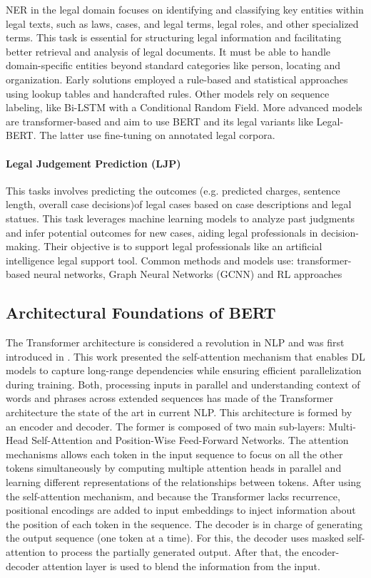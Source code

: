 \documentclass[onecolumn, journal, english, 12pt, a4paper]{IEEEtran} %
\theoremstyle{definition}
\begin{document}
NER in the legal domain focuses on identifying and classifying key
entities within legal texts, such as laws, cases, and legal terms,
legal roles, and other specialized terms. This task is essential for
structuring legal information and facilitating better retrieval and
analysis of legal documents. It must be able to handle domain-specific
entities beyond standard categories like person, locating and
organization. Early solutions employed a rule-based and statistical
approaches using lookup tables and handcrafted rules. Other models
rely on sequence labeling, like Bi-LSTM with a Conditional Random
Field. More advanced models are transformer-based and aim to use BERT
and its legal variants like Legal-BERT. The latter use fine-tuning on
annotated legal corpora\cite{Ariai2024}.

\paragraph{Legal Judgement Prediction (LJP)}
This tasks involves predicting the outcomes (e.g. predicted charges,
sentence length, overall case decisions)of legal cases based on
case descriptions and legal statues. This task leverages machine
learning models to analyze past judgments and infer potential outcomes
for new cases, aiding legal professionals in
decision-making. Their objective is to support legal professionals
like an artificial intelligence legal support tool.  Common methods
and models use: transformer-based neural networks, Graph Neural
Networks (GCNN) and RL approaches\cite{Ariai2024}


\subsection{Architectural Foundations of BERT}
\label{sec:arch-fond-bert}

The Transformer architecture is considered a revolution in NLP and was
first introduced in \cite{vaswani2017attention}. This work presented
the self-attention mechanism that enables DL models to capture
long-range dependencies while ensuring efficient parallelization during
training. Both, processing inputs in parallel and understanding
context of words and phrases across extended sequences has made of the
Transformer architecture the state of the art in current NLP. This
architecture is formed by an encoder and decoder. The former is
composed of two main sub-layers: Multi-Head Self-Attention and
Position-Wise Feed-Forward Networks. The attention mechanisms allows
each token in the input sequence to focus on all the other tokens
simultaneously by computing multiple attention heads in parallel and
learning different representations of the relationships between
tokens. After using the self-attention mechanism, and because the
Transformer lacks recurrence, positional encodings are added to input
embeddings to inject information about the position of each token in
the sequence. The decoder is in charge of generating the output
sequence (one token at a time). For this, the decoder uses masked
self-attention to process the partially generated output. After that,
the encoder-decoder attention layer is used to blend the information
from the input.
\end{document}
